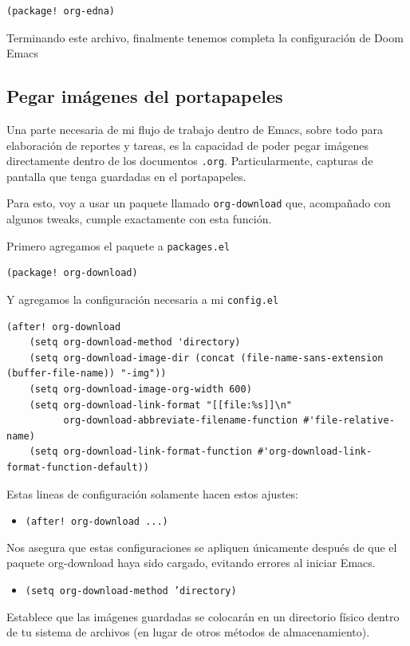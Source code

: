 \documentclass[11pt]{article}
\begin{document}
\begin{verbatim}
(package! org-edna)
\end{verbatim}


Terminando este archivo, finalmente tenemos completa la configuración de Doom Emacs
\subsection{Pegar imágenes del portapapeles}
\label{sec:orgd3351e7}

Una parte necesaria de mi flujo de trabajo dentro de Emacs, sobre todo para elaboración de reportes y tareas, es la capacidad de poder pegar imágenes directamente dentro de los documentos \texttt{.org}. Particularmente, capturas de pantalla que tenga guardadas en el portapapeles.

Para esto, voy a usar un paquete llamado \texttt{org-download} que, acompañado con algunos tweaks, cumple exactamente con esta función.

Primero agregamos el paquete a \texttt{packages.el}

\begin{verbatim}
(package! org-download)
\end{verbatim}

Y agregamos la configuración necesaria a mi \texttt{config.el}

\begin{verbatim}
(after! org-download
    (setq org-download-method 'directory)
    (setq org-download-image-dir (concat (file-name-sans-extension (buffer-file-name)) "-img"))
    (setq org-download-image-org-width 600)
    (setq org-download-link-format "[[file:%s]]\n"
          org-download-abbreviate-filename-function #'file-relative-name)
    (setq org-download-link-format-function #'org-download-link-format-function-default))
\end{verbatim}

Estas lineas de configuración solamente hacen estos ajustes:

\begin{itemize}
\item \texttt{(after! org-download ...)}
\end{itemize}
Nos asegura que estas configuraciones se apliquen únicamente después de que el paquete org-download haya sido cargado, evitando errores al iniciar Emacs.

\begin{itemize}
\item \texttt{(setq org-download-method 'directory)}
\end{itemize}
Establece que las imágenes guardadas se colocarán en un directorio físico dentro de tu sistema de archivos (en lugar de otros métodos de almacenamiento).
\end{document}
